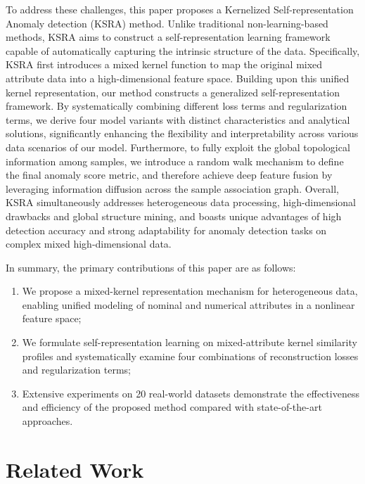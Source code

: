 \documentclass[ASNA,twocolumn]{USG} %
\begin{document}
To address these challenges, this paper proposes a Kernelized Self-representation Anomaly detection (KSRA) method. Unlike traditional non-learning-based methods, KSRA aims to construct a self-representation learning framework capable of automatically capturing the intrinsic structure of the data.
Specifically, KSRA first introduces a mixed kernel function to map the original mixed attribute data into a high-dimensional feature space. Building upon this unified kernel representation, our method constructs a generalized self-representation framework. By systematically combining different loss terms and regularization terms, we derive four model variants with distinct characteristics and analytical solutions, significantly enhancing the flexibility and interpretability across various data scenarios of our model. Furthermore, to fully exploit the global topological information among samples, we introduce a random walk mechanism to define the final anomaly score metric, and therefore achieve deep feature fusion by leveraging information diffusion across the sample association graph. Overall, KSRA simultaneously addresses heterogeneous data processing, high-dimensional drawbacks and global structure mining, and boasts unique advantages of high detection accuracy and strong adaptability for anomaly detection tasks on complex mixed high-dimensional data.

In summary, the primary contributions of this paper are as follows:
\begin{enumerate}[\indent (1)]
    \item We propose a mixed-kernel representation mechanism for heterogeneous data, enabling unified modeling of nominal and numerical attributes in a nonlinear feature space;

    \item We formulate self-representation learning on mixed-attribute kernel similarity profiles and systematically examine four combinations of reconstruction losses and regularization terms;

    \item Extensive experiments on 20 real-world datasets demonstrate the effectiveness and efficiency of the proposed method compared with state-of-the-art approaches.
\end{enumerate}

 
\section{Related Work}\label{Related work}
\end{document}
